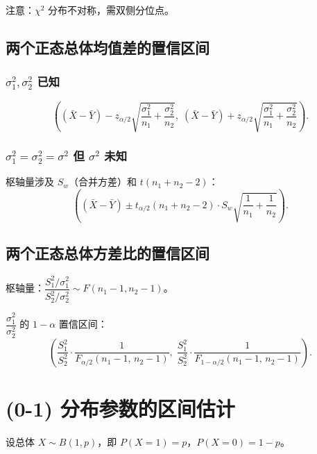注意：$\chi^2$ 分布不对称，需双侧分位点。

\subsection{两个正态总体均值差的置信区间}

\subsubsection{$\sigma_1^2, \sigma_2^2$ 已知}

\begin{equation}
    \boxed{\left((\bar{X} - \bar{Y}) - z_{\alpha/2} \sqrt{\frac{\sigma_1^2}{n_1} + \frac{\sigma_2^2}{n_2}},\;
                 (\bar{X} - \bar{Y}) + z_{\alpha/2} \sqrt{\frac{\sigma_1^2}{n_1} + \frac{\sigma_2^2}{n_2}}\right)}.
\end{equation}

\subsubsection{$\sigma_1^2 = \sigma_2^2 = \sigma^2$ 但 $\sigma^2$ 未知}

枢轴量涉及 $S_w$（合并方差）和 $t(n_1+n_2-2)$：
\begin{equation}
    \boxed{\left((\bar{X} - \bar{Y}) \pm t_{\alpha/2}(n_1+n_2-2) \cdot S_w \sqrt{\frac{1}{n_1} + \frac{1}{n_2}}\right)}.
\end{equation}

\subsection{两个正态总体方差比的置信区间}

枢轴量：$\dfrac{S_1^2 / \sigma_1^2}{S_2^2 / \sigma_2^2} \sim F(n_1-1, n_2-1)$。

$\dfrac{\sigma_1^2}{\sigma_2^2}$ 的 $1-\alpha$ 置信区间：
\begin{equation}
    \boxed{\left(\frac{S_1^2}{S_2^2} \cdot \frac{1}{F_{\alpha/2}(n_1-1,\, n_2-1)},\;
                 \frac{S_1^2}{S_2^2} \cdot \frac{1}{F_{1-\alpha/2}(n_1-1,\, n_2-1)}\right)}.
\end{equation}

\section{(0-1) 分布参数的区间估计}

设总体 $X \sim B(1, p)$，即 $P(X=1) = p$，$P(X=0) = 1-p$。

